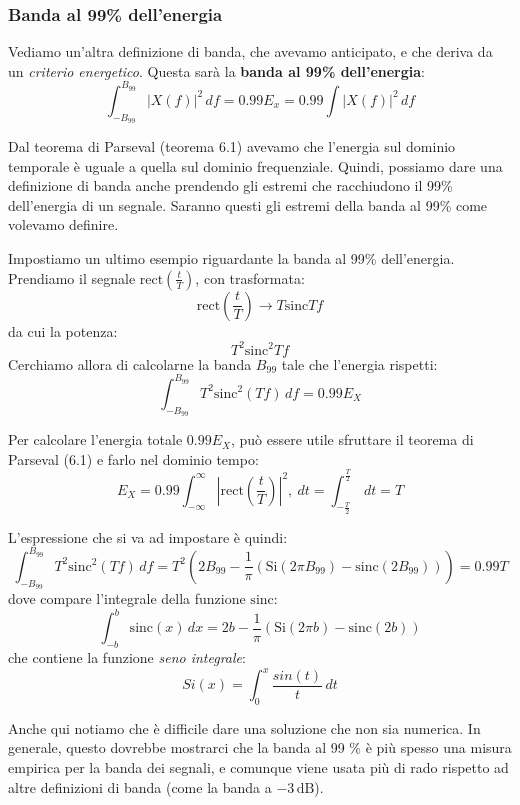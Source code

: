 \documentclass[a4paper,11pt]{article}
\begin{document}
\subsubsection{Banda al 99\% dell'energia}
Vediamo un'altra definizione di banda, che avevamo anticipato, e che deriva da un \textit{criterio energetico}. Questa sarà la \textbf{banda al 99\% dell'energia}:
$$
\int_{-B_{99}}^{B_{99}} |X(f)|^2 \, df = 0.99 E_x = 0.99 \int |X(f)|^2 \, df
$$

Dal teorema di Parseval (teorema 6.1) avevamo che l'energia sul dominio temporale è uguale a quella sul dominio frequenziale. Quindi, possiamo dare una definizione di banda anche prendendo gli estremi che racchiudono il 99\% dell'energia di un segnale. Saranno questi gli estremi della banda al 99\% come volevamo definire.

\par\smallskip

Impostiamo un ultimo esempio riguardante la banda al 99\% dell'energia. Prendiamo il segnale $\mathrm{rect}\left( \frac{t}{T} \right)$, con trasformata:
$$
\mathrm{rect}\left( \frac{t}{T} \right) \rightarrow T \mathrm{sinc}{T f} 
$$
da cui la potenza:
$$
T^2 \mathrm{sinc}^2{T f} 
$$
Cerchiamo allora di calcolarne la banda $B_{99}$ tale che l'energia rispetti:
$$
\int_{-B_{99}}^{B_{99}} T^2 \mathrm{sinc}^2 \left( T f \right) \, df = 0.99 E_X
$$

Per calcolare l'energia totale $0.99 E_X$, può essere utile sfruttare il teorema di Parseval (6.1) e farlo nel dominio tempo:
$$
E_X = 0.99 \int_{-\infty}^{\infty} | \mathrm{rect}\left( \frac{t}{T} \right) |^2 ,\ dt = \int_{-\frac{T}{2}}^{\frac{T}{2}} \, dt = T
$$

L'espressione che si va ad impostare è quindi:
$$
\int_{-B_{99}}^{B_{99}} T^2 \mathrm{sinc}^2 \left( T f \right) \, df 
= T^2 \left( 2 B_{99} - \frac{1}{\pi} \left( \mathrm{Si}(2 \pi B_{99}) - \mathrm{sinc} (2 B_{99}) \right) \right)
= 0.99 T
$$
dove compare l'integrale della funzione $\mathrm{sinc}$:
$$
\int_{-b}^{b} \mathrm{sinc}(x) \, dx =
2 b - \frac{1}{\pi} \left( \mathrm{Si}(2 \pi b) - \mathrm{sinc} (2 b) \right)
$$
che contiene la funzione \textit{seno integrale}:
$$
Si(x) = \int_0^x \frac{sin(t)}{t} \, dt
$$

Anche qui notiamo che è difficile dare una soluzione che non sia numerica. In generale, questo dovrebbe mostrarci che la banda al 99 \% è più spesso una misura empirica per la banda dei segnali, e comunque viene usata più di rado rispetto ad altre definizioni di banda (come la banda a $-3 \, \mathrm{dB}$).
\end{document}
